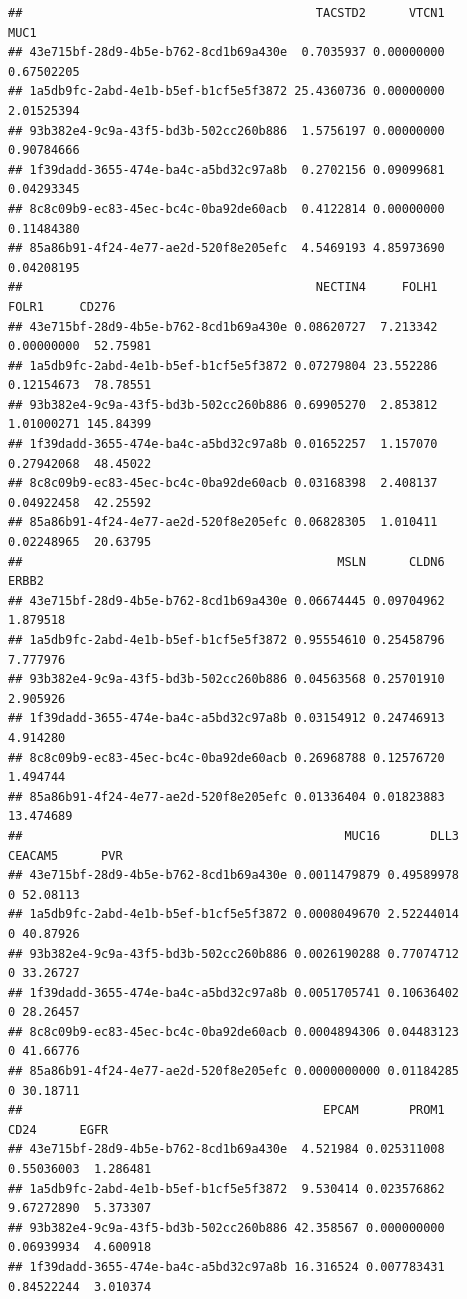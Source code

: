 \documentclass[
]{book}
\begin{document}
\begin{verbatim}
##                                         TACSTD2      VTCN1       MUC1
## 43e715bf-28d9-4b5e-b762-8cd1b69a430e  0.7035937 0.00000000 0.67502205
## 1a5db9fc-2abd-4e1b-b5ef-b1cf5e5f3872 25.4360736 0.00000000 2.01525394
## 93b382e4-9c9a-43f5-bd3b-502cc260b886  1.5756197 0.00000000 0.90784666
## 1f39dadd-3655-474e-ba4c-a5bd32c97a8b  0.2702156 0.09099681 0.04293345
## 8c8c09b9-ec83-45ec-bc4c-0ba92de60acb  0.4122814 0.00000000 0.11484380
## 85a86b91-4f24-4e77-ae2d-520f8e205efc  4.5469193 4.85973690 0.04208195
##                                         NECTIN4     FOLH1      FOLR1     CD276
## 43e715bf-28d9-4b5e-b762-8cd1b69a430e 0.08620727  7.213342 0.00000000  52.75981
## 1a5db9fc-2abd-4e1b-b5ef-b1cf5e5f3872 0.07279804 23.552286 0.12154673  78.78551
## 93b382e4-9c9a-43f5-bd3b-502cc260b886 0.69905270  2.853812 1.01000271 145.84399
## 1f39dadd-3655-474e-ba4c-a5bd32c97a8b 0.01652257  1.157070 0.27942068  48.45022
## 8c8c09b9-ec83-45ec-bc4c-0ba92de60acb 0.03168398  2.408137 0.04922458  42.25592
## 85a86b91-4f24-4e77-ae2d-520f8e205efc 0.06828305  1.010411 0.02248965  20.63795
##                                            MSLN      CLDN6     ERBB2
## 43e715bf-28d9-4b5e-b762-8cd1b69a430e 0.06674445 0.09704962  1.879518
## 1a5db9fc-2abd-4e1b-b5ef-b1cf5e5f3872 0.95554610 0.25458796  7.777976
## 93b382e4-9c9a-43f5-bd3b-502cc260b886 0.04563568 0.25701910  2.905926
## 1f39dadd-3655-474e-ba4c-a5bd32c97a8b 0.03154912 0.24746913  4.914280
## 8c8c09b9-ec83-45ec-bc4c-0ba92de60acb 0.26968788 0.12576720  1.494744
## 85a86b91-4f24-4e77-ae2d-520f8e205efc 0.01336404 0.01823883 13.474689
##                                             MUC16       DLL3 CEACAM5      PVR
## 43e715bf-28d9-4b5e-b762-8cd1b69a430e 0.0011479879 0.49589978       0 52.08113
## 1a5db9fc-2abd-4e1b-b5ef-b1cf5e5f3872 0.0008049670 2.52244014       0 40.87926
## 93b382e4-9c9a-43f5-bd3b-502cc260b886 0.0026190288 0.77074712       0 33.26727
## 1f39dadd-3655-474e-ba4c-a5bd32c97a8b 0.0051705741 0.10636402       0 28.26457
## 8c8c09b9-ec83-45ec-bc4c-0ba92de60acb 0.0004894306 0.04483123       0 41.66776
## 85a86b91-4f24-4e77-ae2d-520f8e205efc 0.0000000000 0.01184285       0 30.18711
##                                          EPCAM       PROM1       CD24      EGFR
## 43e715bf-28d9-4b5e-b762-8cd1b69a430e  4.521984 0.025311008 0.55036003  1.286481
## 1a5db9fc-2abd-4e1b-b5ef-b1cf5e5f3872  9.530414 0.023576862 9.67272890  5.373307
## 93b382e4-9c9a-43f5-bd3b-502cc260b886 42.358567 0.000000000 0.06939934  4.600918
## 1f39dadd-3655-474e-ba4c-a5bd32c97a8b 16.316524 0.007783431 0.84522244  3.010374

\end{verbatim}
\end{document}
